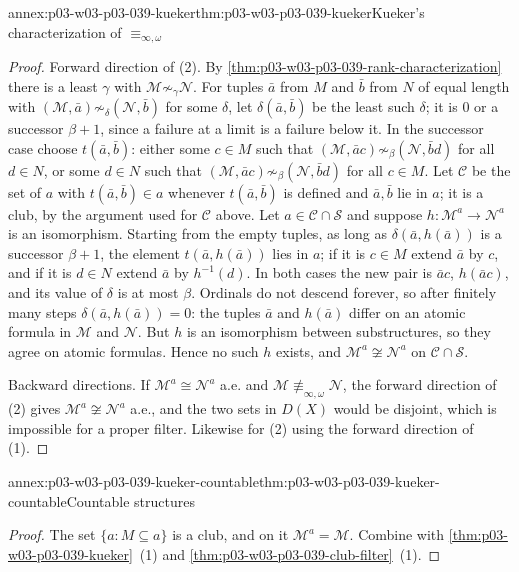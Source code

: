 \begin{annexitem}{annex:p03-w03-p03-039-kueker}{thm:p03-w03-p03-039-kueker}{Kueker's characterization of \(\equiv_{\infty,\omega}\)}
\begin{proof}
Forward direction of (2). By \cref{thm:p03-w03-p03-039-rank-characterization}
there is a least \(\gamma\) with \(\mathcal M\not\sim_\gamma\mathcal N\).
For tuples \(\bar a\) from \(M\) and \(\bar b\) from \(N\) of equal length
with \((\mathcal M,\bar a)\not\sim_\delta(\mathcal N,\bar b)\) for some
\(\delta\), let \(\delta(\bar a,\bar b)\) be the least such \(\delta\); it is
\(0\) or a successor \(\beta+1\), since a failure at a limit is a failure
below it. In the successor case choose \(t(\bar a,\bar b)\): either some
\(c\in M\) such that \((\mathcal M,\bar ac)\not\sim_\beta(\mathcal N,\bar bd)\)
for all \(d\in N\), or some \(d\in N\) such that
\((\mathcal M,\bar ac)\not\sim_\beta(\mathcal N,\bar bd)\) for all \(c\in M\).
Let \(\mathcal C\) be the set of \(a\) with \(t(\bar a,\bar b)\in a\)
whenever \(t(\bar a,\bar b)\) is defined and \(\bar a,\bar b\) lie in
\(a\); it is a club, by the argument used for \(\mathcal C\) above. Let
\(a\in\mathcal C\cap\mathcal S\) and suppose \(h:\mathcal M^a\to\mathcal N^a\)
is an isomorphism. Starting from the empty tuples, as long as
\(\delta(\bar a,h(\bar a))\) is a successor \(\beta+1\), the element
\(t(\bar a,h(\bar a))\) lies in \(a\); if it is \(c\in M\) extend
\(\bar a\) by \(c\), and if it is \(d\in N\) extend \(\bar a\) by
\(h^{-1}(d)\). In both cases the new pair is \(\bar ac\), \(h(\bar ac)\),
and its value of \(\delta\) is at most \(\beta\). Ordinals do not descend
forever, so after finitely many steps \(\delta(\bar a,h(\bar a))=0\): the
tuples \(\bar a\) and \(h(\bar a)\) differ on an atomic formula in
\(\mathcal M\) and \(\mathcal N\). But \(h\) is an isomorphism between
substructures, so they agree on atomic formulas. Hence no such \(h\) exists,
and \(\mathcal M^a\not\cong\mathcal N^a\) on \(\mathcal C\cap\mathcal S\).

Backward directions. If \(\mathcal M^a\cong\mathcal N^a\) a.e. and
\(\mathcal M\not\equiv_{\infty,\omega}\mathcal N\), the forward direction of
(2) gives \(\mathcal M^a\not\cong\mathcal N^a\) a.e., and the two sets in
\(D(X)\) would be disjoint, which is impossible for a proper filter.
Likewise for (2) using the forward direction of (1).
\end{proof}
\end{annexitem}

\begin{annexitem}{annex:p03-w03-p03-039-kueker-countable}{thm:p03-w03-p03-039-kueker-countable}{Countable structures}
\begin{proof}
The set \(\{a:M\subseteq a\}\) is a club, and on it \(\mathcal M^a=\mathcal M\).
Combine with \cref{thm:p03-w03-p03-039-kueker}~(1) and
\cref{thm:p03-w03-p03-039-club-filter}~(1).
\end{proof}
\end{annexitem}


